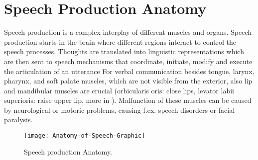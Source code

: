\begin{comment}
\begin{figure}[htbp]
\centering
 \subbottom[Example of games that can be used for SLP therapy.Descriptive game from ]{%
    \texttt{[image: gameSLP]}}%
 \subbottom[Electrglottograph also called laryngograph]{%
    \hspace{0.5cm}\texttt{[image: egg]}}
 \subbottom[Airflow machine]{%
    \texttt{[image: airflow\_machine]}}%
    \subbottom[ultrasound]{%
    \hspace{0.5cm}\texttt{[image: ultrasoundhat]}} 
 \subbottom[Palatometer with electrodes]{%
    \texttt{[image: palatometer]}}    	
\subbottom[Smart palate]{%
    \hspace{0.5cm}\texttt{[image: smartpalate]}}%
 
\caption{Devices used by SLPs}
\label{fig:tools}
\end{figure}





\end{comment}



\section{Speech Production Anatomy}
Speech production is a complex interplay of different muscles and organs. Speech production starts in the brain where different regions interact to control the speech processes. Thoughts are translated into linguistic representations which are then sent to speech mechanisms that coordinate, initiate, modify and execute the articulation of an utterance 
For verbal communication besides tongue, larynx, pharynx, and soft palate muscles, which are not visible from the exterior, also lip and mandibular muscles are crucial (orbicularis oris: close lips, levator labii superioris: raise upper lip, more in \cite{PhonManual}). 
Malfunction of these muscles can be caused by neurological or motoric problems, causing f.ex. speech disorders or facial paralysis. 

\begin{figure}
    \centering
    \texttt{[image: Anatomy-of-Speech-Graphic]}
    \caption{Speech production Anatomy.}
    \label{fig:speechmuscles}
\end{figure}


